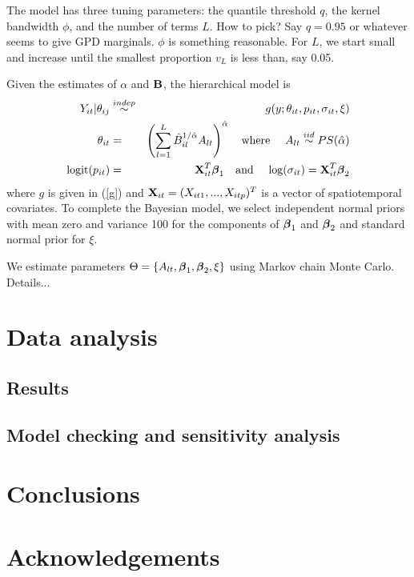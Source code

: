 \documentclass[12pt]{article}
\newcommand{\bbeta}{ \mbox{\boldmath $\beta$}}
\newcommand{\bX}{ \mbox{\bf X}}
\newcommand{\bB}{ \mbox{\bf B}}
\newcommand{\alphahat}{{\hat \alpha}}
\newcommand{\iid}{\stackrel{iid}{\sim}}
\newcommand{\indep}{\stackrel{indep}{\sim}}
\newcommand{\beqn}{ \begin{eqnarray}}
\newcommand{\eeqn}{ \end{eqnarray}}
\begin{document}
The model has three tuning parameters: the quantile threshold $q$, the kernel bandwidth $\phi$, and the number of terms $L$.  How to pick?  Say $q=0.95$ or whatever seems to give GPD marginals.  $\phi$ is something reasonable.  For $L$, we start small and increase until the smallest proportion $v_L$ is less than, say 0.05.  

Given the estimates of $\alpha$ and $\bB$, the hierarchical model is
\beqn \label{bayesmodel}
  Y_{it} |\theta_{ij} & \indep & g(y;\theta_{it},p_{it},\sigma_{it},\xi) \\
  \theta_{it} &=& \left(\sum_{l=1}^L{\hat B}_{il}^{1/\alphahat}A_{lt}\right)^{\alphahat}
  \mbox{\ \ \ where \ \ \ }
  A_{lt} \iid PS(\alphahat)\nonumber\\
  \mbox{logit}(p_{it}) &=& \bX_{it}^T\bbeta_1 
  \mbox{\ \ \ and \ \ \ }
  \mbox{log}(\sigma_{it}) = \bX_{it}^T\bbeta_2 \nonumber
\eeqn
where $g$ is given in (\ref{g}) and $\bX_{it} = (X_{it1},...,X_{itp})^T$ is a vector of spatiotemporal covariates.  To complete the Bayesian model, we select independent normal priors with mean zero and variance 100 for the components of $\bbeta_1$ and $\bbeta_2$ and standard normal prior for $\xi$.

We estimate parameters $\Theta=\{A_{lt}, \bbeta_1,\bbeta_2,\xi\}$ using Markov chain Monte Carlo. Details...

\section{Data analysis}\label{s:analysis}

\subsection{Results}\label{s:results}

\subsection{Model checking and sensitivity analysis}


\section{Conclusions}\label{s:con}

\section*{Acknowledgements}


\begin{singlespace}


\end{singlespace}
\end{document}
